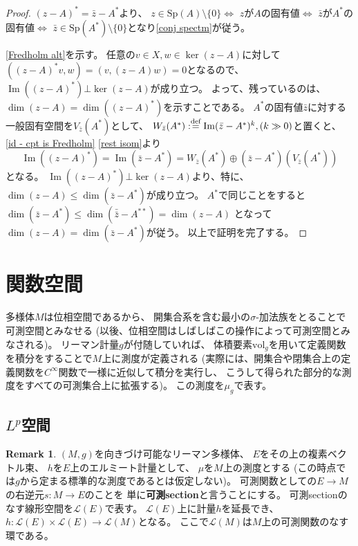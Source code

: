 \documentclass[uplatex]{jsarticle}
\theoremstyle{definition}
\newtheorem{rem}[rem]{Remark}
\DeclareMathOperator{\im}{\mathrm{Im}}
\newcommand{\dfn}{:\overset{\mbox{{\scriptsize def}}}{=}}
\newcommand{\mcL}{\mathcal{L}}
\newcommand{\spectm}{\mathrm{Sp}}
\begin{document}
\begin{proof}
  \((z-A)^* = \bar{z} - A^*\)より、
  \(z\in \spectm(A)\setminus \{0\}\)\(\iff\)
  \(z\)が\(A\)の固有値\(\iff\)
  \(\bar{z}\)が\(A^*\)の固有値\(\iff\)
  \(\bar{z}\in \spectm(A^*)\setminus \{0\}\)となり\ref{conj spectm}が従う。

  \ref{Fredholm alt}を示す。
  任意の\(v\in X,w\in \ker(z-A)\)に対して
  \(((z-A)^*v,w) = (v,(z-A)w) = 0\)となるので、
  \(\im((z-A)^*)\bot \ker(z-A)\)が成り立つ。
  よって、残っているのは、\(\dim(z-A)=\dim((z-A)^*)\)を示すことである。
  \(A^*\)の固有値\(\bar{z}\)に対する一般固有空間を\(V_{\bar{z}}(A^*)\)として、
  \(W_{\bar{z}}(A^*)\dfn \im(\bar{z}-A^*)^k, (k\gg 0)\)と置くと、
  \autoref{id - cpt is Fredholm} \ref{rest isom}より
  \[\im((z-A)^*) = \im(\bar{z}-A^*) = W_{\bar{z}}(A^*) \oplus (\bar{z}-A^*)(V_{\bar{z}}(A^*))\]
  となる。
  \(\im((z-A)^*)\bot\ker(z-A)\)より、特に、
  \(\dim(z-A)\leq \dim(\bar{z}-A^*)\)が成り立つ。
  \(A^*\)で同じことをすると
  \(\dim(\bar{z}-A^*)\leq \dim(\bar{\bar{z}}-A^{**}) = \dim(z-A)\)
  となって\(\dim(z-A)=\dim(\bar{z}-A^*)\)が従う。
  以上で証明を完了する。
\end{proof}












\section{関数空間}

多様体\(M\)は位相空間であるから、
開集合系を含む最小の\(\sigma\)-加法族をとることで可測空間とみなせる
(以後、位相空間はしばしばこの操作によって可測空間とみなされる)。
リーマン計量\(g\)が付随していれば、
体積要素\(\mathrm{vol}_g\)を用いて定義関数を積分をすることで\(M\)上に測度が定義される
(実際には、開集合や閉集合上の定義関数を\(C^{\infty}\)関数で一様に近似して積分を実行し、
こうして得られた部分的な測度をすべての可測集合上に拡張する)。
この測度を\(\mu_g\)で表す。






\subsection{\(L^p\)空間}


\begin{rem}
  \((M,g)\)を向きづけ可能なリーマン多様体、
  \(E\)をその上の複素ベクトル束、
  \(h\)を\(E\)上のエルミート計量として、
  \(\mu\)を\(M\)上の測度とする
  (この時点では\(g\)から定まる標準的な測度であるとは仮定しない)。
  可測関数としての\(E\to M\)の右逆元\(s:M\to E\)のことを
  単に\textbf{可測section}と言うことにする。
  可測sectionのなす線形空間を\(\mcL(E)\)で表す。
  \(\mcL(E)\)上に計量\(h\)を延長でき、
  \(h: \mcL(E)\times \mcL(E) \to \mcL(M)\)となる。
  ここで\(\mcL(M)\)は\(M\)上の可測関数のなす環である。
\end{rem}
\end{document}
